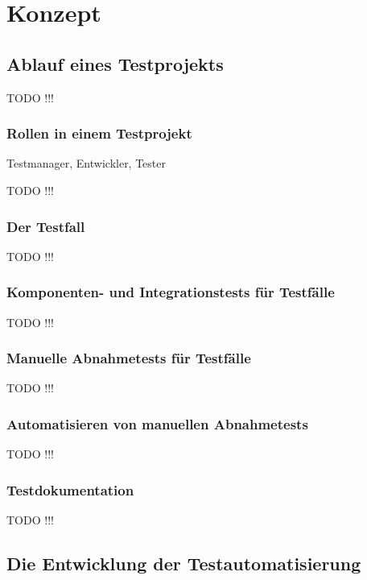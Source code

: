\chapter{Konzept}
\label{cha:Konzept}

\section{Ablauf eines Testprojekts}

TODO !!!

\subsection{Rollen in einem Testprojekt}

Testmanager, Entwickler, Tester

TODO !!!

\subsection{Der Testfall}

TODO !!!

\subsection{Komponenten- und Integrationstests für Testfälle}

TODO !!!

\subsection{Manuelle Abnahmetests für Testfälle}

TODO !!!

\subsection{Automatisieren von manuellen Abnahmetests}

TODO !!!

\subsection{Testdokumentation}

TODO !!!

\section{Die Entwicklung der Testautomatisierung}

